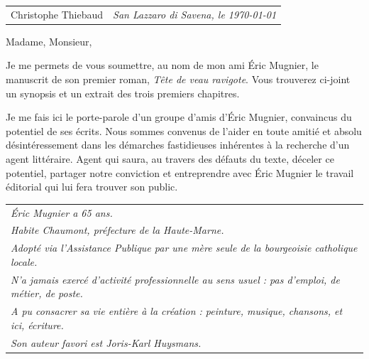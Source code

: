 \documentclass[11pt,a4paper]{article}
\begin{document}
\noindent
\begin{tabularx}{\linewidth}{@{}X r@{}}
  {\small Christophe Thiebaud} &
  {\small\itshape San Lazzaro di Savena, le \today}
\end{tabularx}

\vspace{7mm}


\vspace{6mm}


\vspace{6mm}

Madame, Monsieur,

\vspace{3mm}

Je me permets de vous soumettre, au nom de mon ami Éric Mugnier, le manuscrit de son premier roman, \textit{Tête de veau ravigote}. Vous trouverez ci-joint un synopsis et un extrait des trois premiers chapitres.

Je me fais ici le porte-parole d'un groupe d'amis d'Éric Mugnier, convaincus du potentiel de ses écrits. Nous sommes convenus de l'aider en toute amitié et absolu désintéressement dans les démarches fastidieuses inhérentes à la recherche d'un agent littéraire. Agent qui saura, au travers des défauts du texte, déceler ce potentiel, partager notre conviction et entreprendre avec Éric Mugnier le travail éditorial qui lui fera trouver son public.

\vspace{6mm}


\smallskip
\noindent\begin{tabular}{@{}>{\itshape}l@{}}
Éric Mugnier a 65 ans.\\
Habite Chaumont, préfecture de la Haute-Marne.\\
Adopté via l'Assistance Publique par une mère seule de la bourgeoisie catholique locale.\\
N'a jamais exercé d'activité professionnelle au sens usuel : pas d'emploi, de métier, de poste.\\
A pu consacrer sa vie entière à la création : peinture, musique, chansons, et ici, écriture.\\
Son auteur favori est Joris-Karl Huysmans.\\
\end{tabular}
\end{document}
